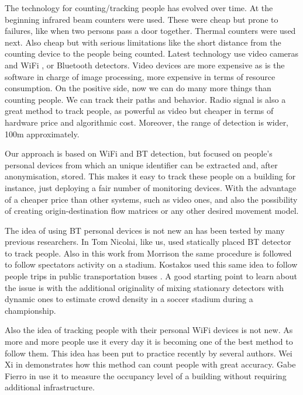 \documentclass[preprint]{elsarticle}
\begin{document}
The technology for counting/tracking people has evolved over time. At the beginning infrared beam counters \cite{Hashimoto199850} were used. These were cheap but prone to failures, like when two persons pass a door together. Thermal counters \cite{635472} were used next. Also cheap but with serious limitations like the short distance from the counting device to the people being counted. Latest technology use video cameras \cite{4107051,Schofield19961421} and WiFi \cite{7134066,7130402}, or Bluetooth \cite{6526732,nicolai2007relationship} detectors. 
Video devices are more expensive as is the software in charge of image processing, more expensive in terms of resource consumption. On the positive side, now we can do many more things than counting people. We can track their paths and behavior. Radio signal is also a great method to track people, as powerful as video but cheaper in terms of hardware price and algorithmic cost. Moreover, the range of detection is wider, 100m approximately.

Our approach is based on WiFi and BT \cite{824570} detection, but focused on people's personal devices from which an unique identifier can be extracted and, after anonymisation, stored. This makes it easy to track these people on a building for instance, just deploying a fair number of monitoring devices. With the advantage of a cheaper price than other systems, such as video ones, and also the possibility of creating origin-destination flow matrices or any other desired movement model.

The idea of using BT personal devices is not new an has been tested by many previous researchers. In \cite{nicolai2007relationship} Tom Nicolai, like us, used statically placed BT detector to track people. Also in this work from Morrison \cite{morrison2009visualisation} the same procedure is followed to follow spectators activity on a stadium. Kostakos used this same idea to follow people trips in public transportation buses \cite{kostakos2008using}.
A good starting point to learn about the issue is \cite{6526732} with the additional originality of mixing stationary detectors with dynamic ones to estimate crowd density in a soccer stadium during a championship.

Also the idea of tracking people with their personal WiFi devices is not new. As more and more people use it every day it is becoming one of the best method to follow them. This idea has been put to practice recently by several authors. Wei Xi in \cite{6847958} demonstrates how this method can count people with great accuracy. Gabe Fierro in \cite{Fierro:2012:ZOC:2422531.2422572} use it to measure the occupancy level of a building without requiring additional infrastructure.
\end{document}
